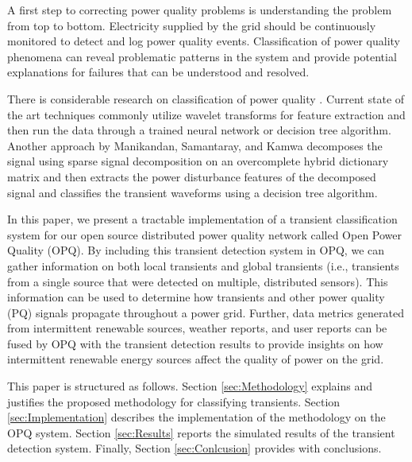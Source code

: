 \documentclass[10pt, conference, compsocconf]{IEEEtran}
\begin{document}
A first step to correcting power quality problems is understanding the problem from top to bottom. Electricity supplied by the grid should be continuously monitored to detect and log power quality events. Classification of power quality phenomena can reveal problematic patterns in the system and provide potential explanations for failures that can be understood and resolved.

There is considerable research on classification of power quality \cite{Garrido:2014:PhenomenaClassification, Manikandan:2014:PQClassificationUsingSSD, Thirumala:2016:PQClassificationUsingWavelet, Rodriguez:2014:PQClassificationUsingANN, Tse:2012:PQClassificationUsingHHT}. Current state of the art techniques commonly utilize wavelet transforms for feature extraction and then run the data through a trained neural network or decision tree algorithm.  Another approach by Manikandan, Samantaray, and Kamwa \cite{Manikandan:2014:PQClassificationUsingSSD} decomposes the signal using sparse signal decomposition on an overcomplete hybrid dictionary matrix and then extracts the power disturbance features of the decomposed signal and classifies the transient waveforms using a decision tree algorithm.

In this paper, we present a tractable implementation of a transient classification system for our open source distributed power quality network called Open Power Quality (OPQ). By including this transient detection system in OPQ, we can gather information on both local transients and global transients (i.e., transients from a single source that were detected on multiple, distributed sensors). This information can be used to determine how transients and other power quality (PQ) signals propagate throughout a power grid. Further, data metrics generated from intermittent renewable sources, weather reports, and user reports can be fused by OPQ with the transient detection results to provide insights on how intermittent renewable energy sources affect the quality of power on the grid.

This paper is structured as follows. Section \ref{sec:Methodology} explains and justifies the proposed methodology for classifying transients. Section \ref{sec:Implementation} describes the implementation of the methodology on the OPQ system. Section \ref{sec:Results} reports the simulated results of the transient detection system. Finally, Section \ref{sec:Conlcusion} provides with conclusions.

\end{document}
